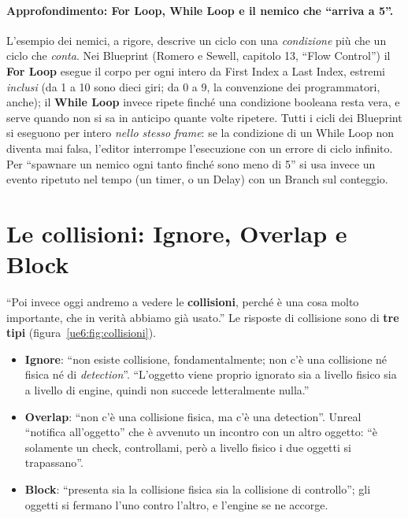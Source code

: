 \paragraph{Approfondimento: For Loop, While Loop e il nemico che ``arriva a 5''.}
L'esempio dei nemici, a rigore, descrive un ciclo con una \emph{condizione} più che un
ciclo che \emph{conta}. Nei Blueprint (Romero e Sewell, capitolo 13, ``Flow Control'')
il \textbf{For Loop} esegue il corpo per ogni intero da First Index a Last Index,
estremi \emph{inclusi} (da 1 a 10 sono dieci giri; da 0 a 9, la convenzione dei
programmatori, anche); il \textbf{While Loop} invece ripete finché una condizione
booleana resta vera, e serve quando non si sa in anticipo quante volte ripetere. Tutti i
cicli dei Blueprint si eseguono per intero \emph{nello stesso frame}: se la condizione di
un While Loop non diventa mai falsa, l'editor interrompe l'esecuzione con un errore di
ciclo infinito. Per ``spawnare un nemico ogni tanto finché sono meno di 5'' si usa invece
un evento ripetuto nel tempo (un timer, o un Delay) con un Branch sul conteggio.

\section{Le collisioni: Ignore, Overlap e Block}
\label{ue6:sec:collisioni}

``Poi invece oggi andremo a vedere le \textbf{collisioni}, perché è una cosa molto
importante, che in verità abbiamo già usato.'' Le risposte di collisione sono di
\textbf{tre tipi} (figura~\ref{ue6:fig:collisioni}).
\begin{itemize}
  \item \textbf{Ignore}: ``non esiste collisione, fondamentalmente; non c'è una
        collisione né fisica né di \emph{detection}''. ``L'oggetto viene proprio
        ignorato sia a livello fisico sia a livello di engine, quindi non succede
        letteralmente nulla.''
  \item \textbf{Overlap}: ``non c'è una collisione fisica, ma c'è una detection''.
        Unreal ``notifica all'oggetto'' che è avvenuto un incontro con un altro oggetto:
        ``è solamente un check, controllami, però a livello fisico i due oggetti si
        trapassano''.
  \item \textbf{Block}: ``presenta sia la collisione fisica sia la collisione di
        controllo''; gli oggetti si fermano l'uno contro l'altro, e l'engine se ne
        accorge.
\end{itemize}

